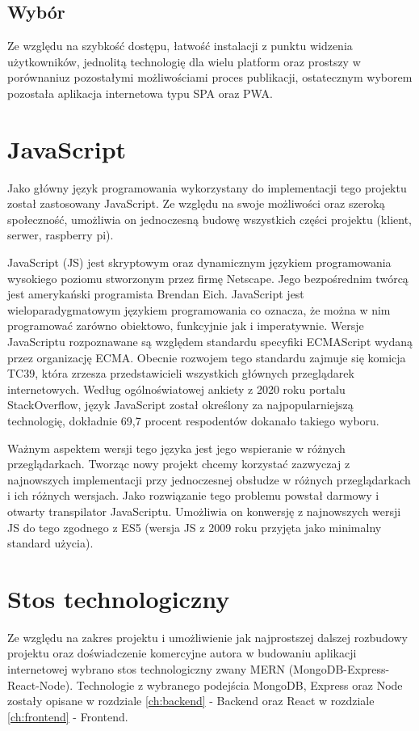 \subsection{Wybór}
Ze względu na szybkość dostępu, łatwość instalacji z punktu widzenia użytkowników, jednolitą technologię dla wielu platform oraz prostszy w porównaniu\newline z pozostałymi możliwościami proces publikacji, ostatecznym wyborem pozostała aplikacja internetowa typu SPA oraz PWA.

\section{JavaScript}
Jako główny język programowania wykorzystany do implementacji tego projektu został zastosowany JavaScript. Ze względu na swoje możliwości oraz szeroką społeczność, umożliwia on jednoczesną budowę wszystkich części projektu (klient, serwer, raspberry pi).

JavaScript (JS) jest skryptowym oraz dynamicznym językiem programowania wysokiego poziomu stworzonym przez firmę Netscape. Jego bezpośrednim twórcą jest amerykański programista Brendan Eich. JavaScript jest wieloparadygmatowym językiem programowania co oznacza, że można w nim programować zarówno obiektowo, funkcyjnie jak i imperatywnie. Wersje JavaScriptu rozpoznawane są względem standardu specyfiki ECMAScript wydaną przez organizację ECMA. Obecnie rozwojem tego standardu zajmuje się komicja TC39, która zrzesza przedstawicieli wszystkich głównych przeglądarek internetowych. \cite{JavaScriptBasics} Według ogólnoświatowej ankiety z 2020 roku portalu StackOverflow, język JavaScript został określony za najpopularniejszą technologię, dokładnie 69,7 procent respodentów dokanało takiego wyboru. \cite{StackOverflowSurvey}

Ważnym aspektem wersji tego języka jest jego wspieranie w różnych przeglądarkach. Tworząc nowy projekt chcemy korzystać zazwyczaj z najnowszych implementacji przy jednoczesnej obsłudze w różnych przeglądarkach i ich różnych wersjach. Jako rozwiązanie tego problemu powstał darmowy i otwarty transpilator JavaScriptu. Umożliwia on konwersję z najnowszych wersji JS do tego zgodnego z ES5 (wersja JS z 2009 roku przyjęta jako minimalny standard użycia).

\section{Stos technologiczny}
Ze względu na zakres projektu i umożliwienie jak najprostszej dalszej rozbudowy projektu oraz doświadczenie komercyjne autora w budowaniu aplikacji internetowej wybrano stos technologiczny zwany MERN (MongoDB-Express-React-Node). Technologie z wybranego podejścia MongoDB, Express oraz Node zostały opisane w rozdziale \ref{ch:backend} - Backend oraz React w rozdziale \ref{ch:frontend} - Frontend.


